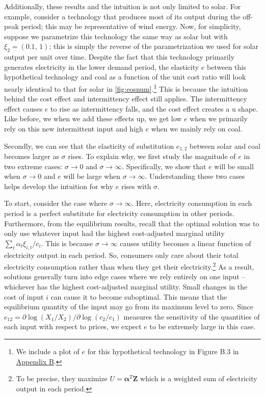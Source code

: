 \documentclass[11pt,a4paper,leqno]{extarticle}
\begin{document}
	
	
	Additionally, these results and the intuition is not only limited to solar. For example, consider a technology that produces most of its output during the off-peak period; this may be representative of wind energy. Now, for simplicity, suppose we parametrize this technology the same way as solar but with $\xi_{2} = (0.1, \, 1)$; this is simply the reverse of the parametrization we used for solar output per unit over time. Despite the fact that this technology primarily generates electricity in the lower demand period, the elasticity $e$ between this hypothetical technology and coal as a function of the unit cost ratio will look nearly identical to that for solar in \autoref{fig:eosnum}.\footnote{ We include a plot of $e$ for this hypothetical technology in Figure B.3 in \hyperref[sec:AppendixB]{Appendix B}.} This is because the intuition behind the cost effect and intermittency effect still applies. The intermittency effect causes $e$ to rise as intermittency falls, and the cost effect creates a u shape. Like before, we when we add these effects up, we get low  $e$ when we primarily rely on this new intermittent input and high $e$ when we mainly rely on coal. 
	
	
	
	Secondly, we can see that the elasticity of substitution $e_{1,2}$ between solar and coal becomes larger  as $\sigma$ rises. To  explain why, we first study the magnitude of $e$ in two extreme cases:  $\sigma \to 0$ and $\sigma \to \infty$. Specifically, we show that $e$ will be small when $\sigma \to 0$ and $e$ will be large when $\sigma \to \infty$. Understanding these two cases helps develop the intuition for why $e$ rises with $\sigma$. 
	
	To start, consider the case where $\sigma \to \infty$. Here, electricity consumption in each period is a perfect substitute for electricity consumption in other periods. Furthermore, from the equilibrium results, recall that the optimal solution was to only use whatever input had the highest cost-adjusted marginal utility $\sum_t \alpha_t \xi_{i,t} /c_i$. This is because $\sigma \to \infty$ causes utility becomes a linear function of electricity output in each period. So, consumers only care about their total electricity consumption rather than when they get their electricity.\footnote{ To be precise, they maximize $U = \boldsymbol{\alpha}^T \mathbf{Z}$ which is a weighted sum of electricity output in each period. 
	}  As a result, solutions generally turn into edge cases where we rely entirely on one input -- whichever has the highest cost-adjusted marginal utility. Small changes in the cost of input $i$ can cause it to become suboptimal. This means that the equilibrium quantity of the input may go from its maximum level to zero. Since $e_{12} = \partial \log(X_1/X_2) / \partial \log(c_2/c_1)$ measures the sensitivity of the quantities of each input with respect to prices, we expect $e$ to be extremely large in this case. 
	
\end{document}
